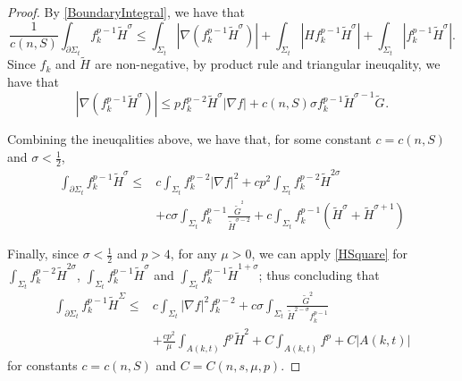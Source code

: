 \begin{proof}
    By \autoref{BoundaryIntegral}, we have that 
    \[
        \frac{1}{c(n,S)}\int_{\partial \Sigma_t} f_{k}^{p-1} \tilde{H}^{\sigma }  \leq \int_{\Sigma_t} \left| \nabla \left( f_{k}^{p-1} \tilde{H}^{\sigma }  \right)  \right| + \int_{\Sigma_t} \left| H f_{k}^{p-1} \tilde{H}^{\sigma } \right| + \int_{\Sigma_t} \left| f_{k}^{p-1} \tilde{H}^{\sigma } \right|.
    \]
    Since $f_{k}^{} $ and $\tilde{H}^{} $ are non-negative, by product rule and triangular ineuqality, we have that
    \[
        \left| \nabla \left( f_{k}^{p-1} \tilde{H}^{\sigma }  \right)  \right| \leq p f_{k}^{p-2} \tilde{H}^{\sigma } \left| \nabla f \right| +c(n,S) \sigma f_{k}^{p-1} \tilde{H}^{\sigma -1} \tilde{G}^{} .
    \]

    Combining the ineuqalities above, we have that, for some constant $c=c(n,S)$ and $\sigma < \frac{1}{2}$,
    \begin{equation}
    \begin{split}
        \int_{\partial \Sigma_t} f_{k}^{p-1} \tilde{H}^{\sigma }  
    \leq &c \int_{\Sigma_t} f_{k}^{p-2} \left| \nabla f \right| ^2 +cp^2 \int_{\Sigma_t} 
    f_{k}^{p-2} \tilde{H}^{2 \sigma } \\
    &+c \sigma \int_{\Sigma_t} f_{k}^{p-1} \frac{\tilde{G}^{^2} }{\tilde{H}^{\sigma -2} }+c \int_{\Sigma_t} f_{k}^{p-1} \left( \tilde{H}^{\sigma } +\tilde{H}^{\sigma +1}  \right) 
    \end{split}
    \end{equation} 

    Finally, since $\sigma < \frac{1}{2}$ and $p>4$, for any $\mu >0$, we can apply \autoref{HSquare} for $\int_{\Sigma_t} f_{k}^{p-2} \tilde{H}^{2 \sigma }  $, $\int_{\Sigma_t} f_{k}^{p-1} \tilde{H}^{ \sigma }  $ and $\int_{\Sigma_t} f_{k}^{p-1} \tilde{H}^{1+ \sigma }  $; thus concluding that
    \begin{equation}
        \begin{split}
            \int_{\partial \Sigma_t} f_{k}^{p-1}\tilde{H}^{\Sigma } 
        \leq & c \int_{\Sigma_t} \left| \nabla f \right| ^2 f_{k}^{p-2} +c \sigma \int_{\Sigma_t} \frac{\tilde{G}^{2} }{\tilde{H}^{2-\sigma } f_{k}^{p-1} } \\
        &+ \frac{cp^2}{\mu }\int_{A(k,t)}^{}f^p \tilde{H}^{2} + C \int_{A(k,t)}^{}f^p + C \left| A(k,t) \right|
        \end{split}
        \end{equation}
        for constants $c=c(n,S)$ and $C=C(n,s,\mu ,p)$.
\end{proof}


